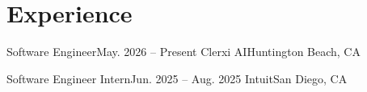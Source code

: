 
\section{Experience}
  \resumeSubHeadingListStart

\resumeSubheading
  {Software Engineer}{May. 2026 -- Present}
  {Clerxi AI}{Huntington Beach, CA}
\resumeItemListStart
      \resumeItemListEnd

    \resumeSubheading
      {Software Engineer Intern}{Jun. 2025 -- Aug. 2025}
      {Intuit}{San Diego, CA}
      \resumeItemListStart
      \resumeItemListEnd
  \resumeSubHeadingListEnd
